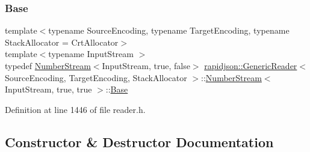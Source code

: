 \subsubsection{\texorpdfstring{Base}{Base}}
{\footnotesize\ttfamily template$<$typename Source\+Encoding, typename Target\+Encoding, typename Stack\+Allocator = Crt\+Allocator$>$ \\
template$<$typename Input\+Stream $>$ \\
typedef \mbox{\hyperlink{classrapidjson_1_1_generic_reader_1_1_number_stream}{Number\+Stream}}$<$Input\+Stream, true, false$>$ \mbox{\hyperlink{classrapidjson_1_1_generic_reader}{rapidjson\+::\+Generic\+Reader}}$<$ Source\+Encoding, Target\+Encoding, Stack\+Allocator $>$\+::\mbox{\hyperlink{classrapidjson_1_1_generic_reader_1_1_number_stream}{Number\+Stream}}$<$ Input\+Stream, true, true $>$\+::\mbox{\hyperlink{classrapidjson_1_1_generic_reader_1_1_number_stream_3_01_input_stream_00_01true_00_01false_01_4_a1765e18550d8e335475e6dfe101ac997}{Base}}\hspace{0.3cm}{\ttfamily [private]}}



Definition at line 1446 of file reader.\+h.



\subsection{Constructor \& Destructor Documentation}
\mbox{\label{classrapidjson_1_1_generic_reader_1_1_number_stream_3_01_input_stream_00_01true_00_01true_01_4_ac2f81ab96b4d0ee505d19d8f53e50b19}} 
